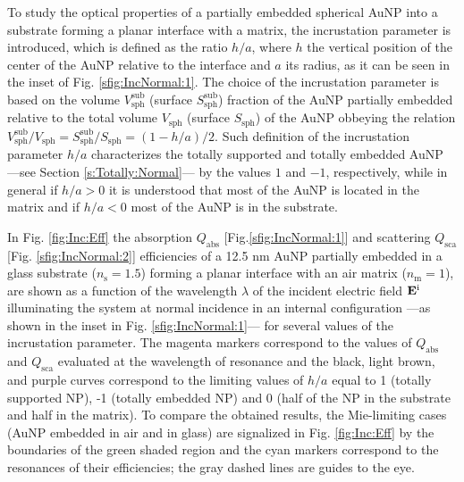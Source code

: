 
To study the optical properties of a partially embedded spherical AuNP into a substrate forming a planar interface with a matrix, the incrustation parameter is introduced, which is defined as the ratio $h/a$, where $h$ the vertical position of the center of the AuNP relative to the interface and $a$ its radius, as it can be seen in the inset of Fig. \ref{sfig:IncNormal:1}. The choice of the incrustation parameter is based on the volume $V_\text{sph}^\text{sub}$ (surface $S_\text{sph}^\text{sub}$) fraction of the
AuNP partially embedded relative to the total volume $V_\text{sph}$ (surface $S_\text{sph}$) of the AuNP   obbeying the relation $V_\text{sph}^\text{sub}/V_\text{sph} = S_\text{sph}^\text{sub}/S_\text{sph} = (1-h/a)/2$. Such definition of the incrustation parameter $h/a$ characterizes the totally supported and totally embedded AuNP  ---see Section \ref{s:Totally:Normal}--- by the values $1$ and $-1$, respectively, while in general  if $h/a>0$ it is understood that most of the AuNP is located in the matrix and if $h/a<0$ most of the AuNP is in the substrate.

In Fig. \ref{fig:Inc:Eff} the absorption $Q_\text{abs}$ [Fig.\ref{sfig:IncNormal:1}] and scattering $Q_\text{sca}$ [Fig. \ref{sfig:IncNormal:2}] efficiencies of a 12.5 nm AuNP partially embedded in a glass substrate ($n_\text{s} = 1.5$) forming a planar interface with an air matrix ($n_\text{m} = 1$), are shown as a function of the wavelength $\lambda$ of the incident electric field $\vb{E}^\text{i}$ illuminating the system at normal incidence in an internal configuration ---as shown in the inset in Fig. \ref{sfig:IncNormal:1}--- for several values of the incrustation parameter. The magenta markers correspond to the values of $Q_\text{abs}$ and $Q_\text{sca}$ evaluated at the wavelength of resonance and the black, light brown, and purple curves correspond to the limiting values of $h/a$ equal to 1 (totally supported NP), -1 (totally embedded NP) and 0 (half of the NP in the substrate and half in the matrix). To compare the obtained results, the Mie-limiting cases (AuNP embedded in air and in glass)  are signalized in Fig. \ref{fig:Inc:Eff} by the boundaries of the green shaded region  and the cyan markers correspond to the resonances of their efficiencies; the gray dashed lines are guides to the eye.

